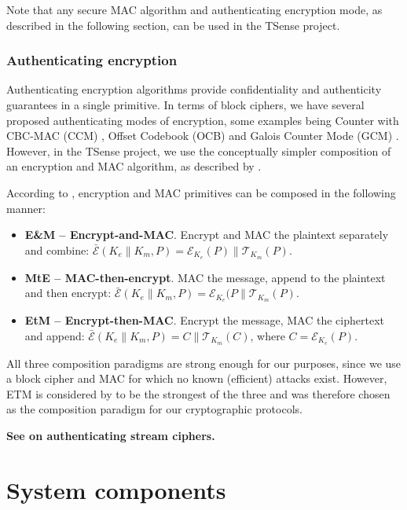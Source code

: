 Note that any secure MAC algorithm and authenticating encryption mode, as described in the following section, can be used in the TSense project.

\subsubsection{Authenticating encryption}

Authenticating encryption algorithms provide confidentiality and authenticity guarantees in a single primitive. In terms of block ciphers, we have several proposed authenticating modes of encryption, some examples being Counter with CBC-MAC (CCM) , Offset Codebook (OCB) \cite{rogaway2003} and Galois Counter Mode (GCM) . However, in the TSense project, we use the conceptually simpler composition of an encryption and MAC algorithm, as described by .

According to , encryption and MAC primitives can be composed in the following manner:
%
\begin{itemize}
\item \textbf{E\&M -- Encrypt-and-MAC}. Encrypt and MAC the plaintext separately and combine: $\bar{\mathcal{E}}(K_e \parallel K_m,P) = \mathcal{E}_{K_e}(P) \parallel \mathcal{T}_{K_m}(P)$.
\item \textbf{MtE -- MAC-then-encrypt}. MAC the message, append to the plaintext and then encrypt: $\bar{\mathcal{E}}(K_e \parallel K_m,P) =\mathcal{E}_{K_e}(P \parallel \mathcal{T}_{K_m}(P)$.
\item \textbf{EtM -- Encrypt-then-MAC}. Encrypt the message, MAC the ciphertext and append: $\bar{\mathcal{E}}(K_e \parallel K_m,P) = C \parallel \mathcal{T}_{K_m}(C)$, where $C=\mathcal{E}_{K_e}(P)$.
\end{itemize}

All three composition paradigms are strong enough for our purposes, since we use a block cipher and MAC for which no known (efficient) attacks exist. However, ETM is considered by \citeauthor{bellare2007} to be the strongest of the three and was therefore chosen as the composition paradigm for our cryptographic protocols.

\textbf{See \cite{teo2009} on authenticating stream ciphers.}

\section{System components}

